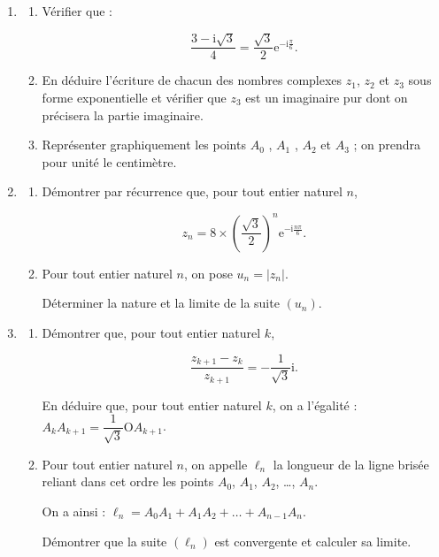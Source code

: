 \documentclass[10pt,a4paper]{article}
\begin{document}
\begin{enumerate}
\item 
	\begin{enumerate}
		\item Vérifier que :
		
\[\dfrac{3 - \text{i}\sqrt{3}}{4} = \dfrac{\sqrt{3}}{2}\text{e}^{- \text{i}\frac{\pi}{6}}.\]
		
		\item En déduire l'écriture de chacun des nombres complexes $z_1$,  $z_2$ et $z_3$ sous forme exponentielle et vérifier que $z_3$ est un imaginaire pur dont on précisera la partie imaginaire.
		\item Représenter graphiquement les points $A_0$ , $A_1$ , $A_2$ et $A_3$ ; on prendra pour unité le centimètre.
 	\end{enumerate}
\item
	\begin{enumerate}
		\item Démontrer par récurrence que, pour tout entier naturel $n$,
		
\[z_n = 8 \times \left(\dfrac{\sqrt{3}}{2}\right)^n \text{e}^{- \text{i}\frac{n\pi}{6}}.\]
		
		\item Pour tout entier naturel $n$, on pose $u_n = \left|z_n\right|$.
		
Déterminer la nature et la limite de la suite $\left(u_n\right)$.
	\end{enumerate}
\item 
	\begin{enumerate}
		\item Démontrer que, pour tout entier naturel $k$,
		
		\[\dfrac{z_{k+1} - z_{k}}{z_{k+1}} = - \dfrac{1}{\sqrt{3}}\text{i}.\]

En déduire que, pour tout entier naturel $k$, on a l'égalité : $A_kA_{k+1} = \dfrac{1}{\sqrt{3}} \text{O}A_{k+1}$.
		\item Pour tout entier naturel $n$, on appelle $\ell_n$ la longueur de la ligne brisée reliant dans cet ordre les points $A_0$,\: $A_1$,\: $A_2$, \ldots , $A_n$.
		
On a ainsi : $\ell_n = A_0A_1 + A_1A_2 + \ldots + A_{n-1}A_n$.
		
Démontrer que la suite $\left(\ell_n\right)$ est convergente et calculer sa limite.
	\end{enumerate}
\end{enumerate}
\end{document}
